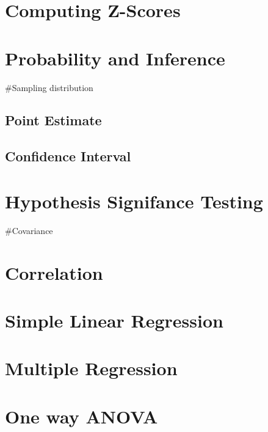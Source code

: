 \documentclass[
]{book}
\begin{document}
\hypertarget{computing-z-scores}{%
\chapter{Computing Z-Scores}\label{computing-z-scores}}

\hypertarget{probability-and-inference}{%
\chapter{Probability and Inference}\label{probability-and-inference}}

\#Sampling distribution

\hypertarget{point-estimate}{%
\section{Point Estimate}\label{point-estimate}}

\hypertarget{confidence-interval}{%
\section{Confidence Interval}\label{confidence-interval}}

\hypertarget{hypothesis-signifance-testing}{%
\chapter{Hypothesis Signifance Testing}\label{hypothesis-signifance-testing}}

\#Covariance

\hypertarget{correlation}{%
\chapter{Correlation}\label{correlation}}

\hypertarget{simple-linear-regression}{%
\chapter{Simple Linear Regression}\label{simple-linear-regression}}

\hypertarget{multiple-regression}{%
\chapter{Multiple Regression}\label{multiple-regression}}

\hypertarget{one-way-anova}{%
\chapter{One way ANOVA}\label{one-way-anova}}
\end{document}
